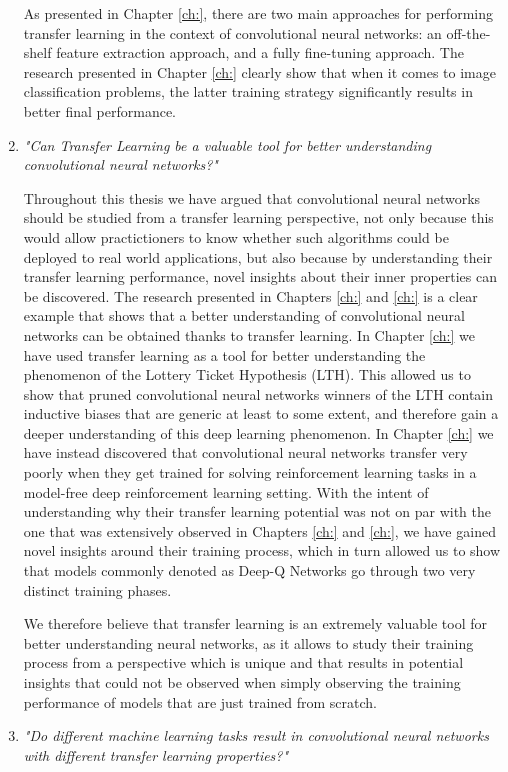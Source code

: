 \begin{enumerate}
	As presented in Chapter \ref{ch:}, there are two main approaches for performing transfer learning in the context of convolutional neural networks: an off-the-shelf feature extraction approach, and a fully fine-tuning approach. The research presented in Chapter \ref{ch:} clearly show that when it comes to image classification problems, the latter training strategy significantly results in better final performance. 

	\item \textit{"Can Transfer Learning be a valuable tool for better understanding convolutional neural networks?"}
	
	Throughout this thesis we have argued that convolutional neural networks should be studied from a transfer learning perspective, not only because this would allow practictioners to know whether such algorithms could be deployed to real world applications, but also because by understanding their transfer learning performance, novel insights about their inner properties can be discovered. The research presented in Chapters \ref{ch:} and \ref{ch:} is a clear example that shows that a better understanding of convolutional neural networks can be obtained thanks to transfer learning. In Chapter \ref{ch:} we have used transfer learning as a tool for better understanding the phenomenon of the Lottery Ticket Hypothesis (LTH). This allowed us to show that pruned convolutional neural networks winners of the LTH contain inductive biases that are generic at least to some extent, and therefore gain a deeper understanding of this deep learning phenomenon. In Chapter \ref{ch:} we have instead discovered that convolutional neural networks transfer very poorly when they get trained for solving reinforcement learning tasks in a model-free deep reinforcement learning setting. With the intent of understanding why their transfer learning potential was not on par with the one that was extensively observed in Chapters \ref{ch:} and \ref{ch:}, we have gained novel insights around their training process, which in turn allowed us to show that models commonly denoted as Deep-Q Networks go through two very distinct training phases. 

We therefore believe that transfer learning is an extremely valuable tool for better understanding neural networks, as it allows to study their training process from a perspective which is unique and that results in potential insights that could not be observed when simply observing the training performance of models that are just trained from scratch.  

	
	\item \textit{"Do different machine learning tasks result in convolutional neural networks with different transfer learning properties?"}

\end{enumerate}






